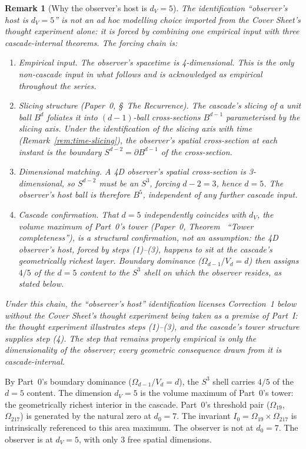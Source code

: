 \documentclass[11pt,a4paper]{article}
\newtheorem{remark}[theorem]{Remark}
\begin{document}
\begin{remark}[Why the observer's host is $d_V = 5$]\label{rem:sp12-status}
The identification ``observer's host is $d_V = 5$'' is not an ad hoc
modelling choice imported from the Cover Sheet's thought experiment
alone: it is forced by combining one empirical input with three
cascade-internal theorems. The forcing chain is:
\begin{enumerate}
\item \emph{Empirical input.} The observer's spacetime is
4-dimensional. This is the only non-cascade input in what follows
and is acknowledged as empirical throughout the series.
\item \emph{Slicing structure (Paper~0, \S~The Recurrence).} The
cascade's slicing of a unit ball $B^d$ foliates it into
$(d-1)$-ball cross-sections $B^{d-1}$ parameterised by the slicing
axis. Under the identification of the slicing axis with time
(Remark~\ref{rem:time-slicing}), the observer's spatial
cross-section at each instant is the boundary
$S^{d-2} = \partial B^{d-1}$ of the cross-section.
\item \emph{Dimensional matching.} A 4D observer's spatial
cross-section is 3-dimensional, so $S^{d-2}$ must be an $S^3$,
forcing $d - 2 = 3$, hence $d = 5$. The observer's host ball is
therefore $B^5$, independent of any further cascade input.
\item \emph{Cascade confirmation.} That $d = 5$ independently
coincides with $d_V$, the volume maximum of Part~0's tower
(Paper~0, Theorem~ ``Tower completeness''), is a \emph{structural
confirmation}, not an assumption: the 4D observer's host, forced by
steps (1)--(3), happens to sit at the cascade's geometrically
richest layer. Boundary dominance ($\Omega_{d-1}/V_d = d$) then
assigns $4/5$ of the $d=5$ content to the $S^3$ shell on which the
observer resides, as stated below.
\end{enumerate}
Under this chain, the ``observer's host'' identification licenses
Correction~1 below without the Cover Sheet's thought experiment
being taken as a premise of Part~I: the thought experiment
illustrates steps (1)--(3), and the cascade's tower structure supplies
step (4). The step that remains properly empirical is only the
dimensionality of the observer; every geometric consequence drawn
from it is cascade-internal.
\end{remark}

By Part~0's boundary dominance ($\Omega_{d-1}/V_d = d$), the $S^3$
shell carries $4/5$ of the $d=5$ content. The dimension $d_V = 5$ is
the volume maximum of Part~0's tower: the geometrically richest
interior in the cascade. Part~0's threshold pair ($\Omega_{19}$,
$\Omega_{217}$) is generated by the natural zero at $d_0 = 7$. The
invariant $I_0 = \Omega_{19}\times\Omega_{217}$ is intrinsically
referenced to this area maximum. The observer is not at $d_0 = 7$.
The observer is at $d_V = 5$, with only 3 free spatial dimensions.
\end{document}
